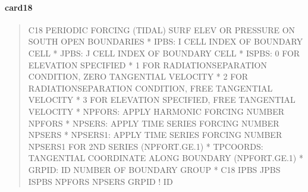 \documentclass[letterpaper,10pt,english]{sphinxmanual}
\begin{document}
\paragraph{card18}
\label{\detokenize{inputfiles/runcontrol/card18:card18}}\label{\detokenize{inputfiles/runcontrol/card18::doc}}\begin{quote}

\begin{sphinxVerbatim}[commandchars=\\\{\}]
\PYGZhy{}\PYGZhy{}\PYGZhy{}\PYGZhy{}\PYGZhy{}\PYGZhy{}\PYGZhy{}\PYGZhy{}\PYGZhy{}\PYGZhy{}\PYGZhy{}\PYGZhy{}\PYGZhy{}\PYGZhy{}\PYGZhy{}\PYGZhy{}\PYGZhy{}\PYGZhy{}\PYGZhy{}\PYGZhy{}\PYGZhy{}\PYGZhy{}\PYGZhy{}\PYGZhy{}\PYGZhy{}\PYGZhy{}\PYGZhy{}\PYGZhy{}\PYGZhy{}\PYGZhy{}\PYGZhy{}\PYGZhy{}\PYGZhy{}\PYGZhy{}\PYGZhy{}\PYGZhy{}\PYGZhy{}\PYGZhy{}\PYGZhy{}\PYGZhy{}\PYGZhy{}\PYGZhy{}\PYGZhy{}\PYGZhy{}\PYGZhy{}\PYGZhy{}\PYGZhy{}\PYGZhy{}\PYGZhy{}\PYGZhy{}\PYGZhy{}\PYGZhy{}\PYGZhy{}\PYGZhy{}\PYGZhy{}\PYGZhy{}\PYGZhy{}\PYGZhy{}\PYGZhy{}\PYGZhy{}\PYGZhy{}\PYGZhy{}\PYGZhy{}\PYGZhy{}\PYGZhy{}\PYGZhy{}\PYGZhy{}\PYGZhy{}\PYGZhy{}\PYGZhy{}\PYGZhy{}\PYGZhy{}\PYGZhy{}\PYGZhy{}\PYGZhy{}\PYGZhy{}\PYGZhy{}\PYGZhy{}
C18 PERIODIC FORCING (TIDAL) SURF ELEV OR PRESSURE ON SOUTH OPEN BOUNDARIES
*  IPBS:     I CELL INDEX OF BOUNDARY CELL
*  JPBS:     J CELL INDEX OF BOUNDARY CELL
*  ISPBS: 0 FOR ELEVATION SPECIFIED
*         1 FOR RADIATION\PYGZhy{}SEPARATION CONDITION, ZERO TANGENTIAL VELOCITY
*         2 FOR RADIATION\PYGZhy{}SEPARATION CONDITION, FREE TANGENTIAL VELOCITY
*         3  FOR ELEVATION SPECIFIED, FREE TANGENTIAL VELOCITY
*  NPFORS:   APPLY HARMONIC FORCING NUMBER NPFORS
*  NPSERS:   APPLY TIME SERIES FORCING NUMBER NPSERS
*  NPSERS1:  APPLY TIME SERIES FORCING NUMBER NPSERS1 FOR 2ND SERIES (NPFORT.GE.1)
*  TPCOORDS: TANGENTIAL COORDINATE ALONG BOUNDARY                    (NPFORT.GE.1)
*  GRPID:    ID NUMBER OF BOUNDARY GROUP
*
C18    IPBS    JPBS   ISPBS  NPFORS  NPSERS      GRPID ! ID
\end{sphinxVerbatim}
\end{quote}
\end{document}
